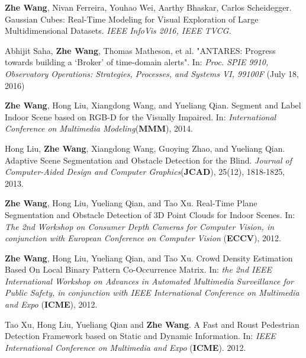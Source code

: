 \documentclass[10pt]{article}
\begin{document}
\begin{bibenum}
    \item \textbf{Zhe Wang}, Nivan Ferreira, Youhao Wei, Aarthy Bhaskar, Carlos Scheidegger. Gaussian Cubes: Real-Time Modeling for Visual Exploration of Large Multidimensional Datasets. 
        \emph{IEEE InfoVis 2016, IEEE TVCG.}

    \item Abhijit Saha, \textbf{Zhe Wang}, Thomas Matheson, et al. "ANTARES: Progress towards building a ‘Broker’ of time-domain alerts". 
        In: \emph{Proc. SPIE 9910, Observatory Operations: Strategies, Processes, and Systems VI, 99100F} (July 18, 2016)

    \item \textbf{Zhe Wang}, Hong Liu, Xiangdong Wang, and Yueliang Qian. Segment and Label Indoor Scene based on RGB-D for the Visually Impaired.
        In: \emph{International Conference on Multimedia Modeling}(\textbf{MMM}), 2014.

    \item Hong Liu, \textbf{Zhe Wang}, Xiangdong Wang, Guoying Zhao, and Yueliang Qian. Adaptive Scene Segmentation and Obstacle Detection for the Blind.
        \emph{Journal of Computer-Aided Design and Computer Graphics}(\textbf{JCAD}), 25(12), 1818-1825, 2013.

    \item \textbf{Zhe Wang}, Hong Liu, Yueliang Qian, and Tao Xu. Real-Time Plane Segmentation and Obstacle Detection of 3D Point Clouds for Indoor Scenes.
        In: \emph{The 2nd Workshop on Consumer Depth Cameras for Computer Vision, in conjunction with European Conference on Computer Vision} (\textbf{ECCV}), 2012.

    \item \textbf{Zhe Wang}, Hong Liu, Yueliang Qian, and Tao Xu. Crowd Density Estimation Based On Local Binary Pattern Co-Occurrence Matrix.
        In: \emph{the 2nd IEEE International Workshop on Advances in Automated Multimedia Surveillance for Public Safety, in conjunction with IEEE International Conference on Multimedia and Expo }(\textbf{ICME}), 2012.

    \item Tao Xu, Hong Liu, Yueliang Qian and \textbf{Zhe Wang}. A Fast and Roust Pedestrian Detection Framework based on Static and Dynamic Information.
        In: \emph{IEEE International Conference on Multimedia and Expo} (\textbf{ICME}). 2012.
\end{bibenum}
\end{document}
